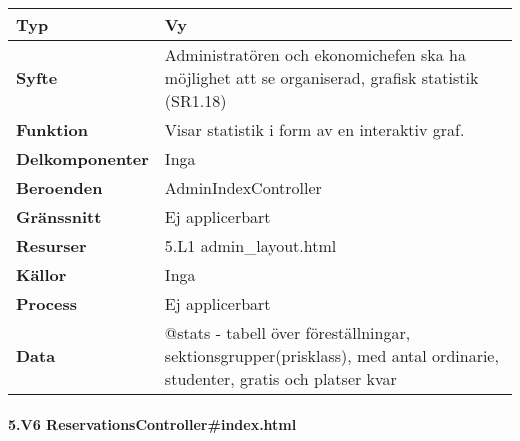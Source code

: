 \documentclass[a4paper, twoside, 11pt, titlepage]{article}
\begin{document}
			\begin {table} [ht] \begin{tabular} {  p{3.5cm} p{11.6cm} }
				\hline
				{\sffamily\textbf{Typ}} & {Vy} \\
				\hline
				{\sffamily\textbf{Syfte}} & {Administratören och ekonomichefen ska ha möjlighet att se organiserad, grafisk statistik (SR1.18)} \\
				\hline
				{\sffamily\textbf{Funktion}} & {Visar statistik i form av en interaktiv graf.} \\
				\hline
				{\sffamily\textbf{Delkomponenter}} & {Inga} \\
				\hline
				{\sffamily\textbf{Beroenden}} & {AdminIndexController} \\
				\hline
				{\sffamily\textbf{Gränssnitt}} & {Ej applicerbart} \\
				\hline
				{\sffamily\textbf{Resurser}} & {5.L1 admin\_layout.html} \\
				\hline
				{\sffamily\textbf{Källor}} & {Inga} \\
				\hline
				{\sffamily\textbf{Process}} & {Ej applicerbart} \\
				\hline
				{\sffamily\textbf{Data}} & {@stats - tabell över föreställningar, sektionsgrupper(prisklass), med antal ordinarie, studenter, gratis och platser kvar} \\
				\hline
			\end{tabular} \end{table} \FloatBarrier


			\clearpage %
			\paragraph{5.V6 ReservationsController\#index.html}\
\end{document}

